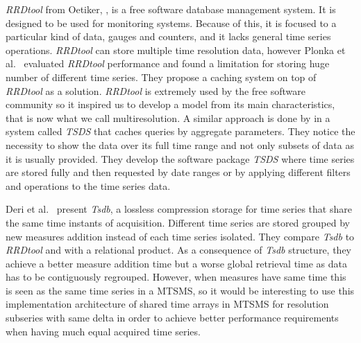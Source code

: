 \emph{RRDtool} from Oetiker, \cite{rrdtool,lisa98:oetiker}, is a free
software database management system. It is designed to be used for
monitoring systems. Because of this, it is focused to a particular
kind of data, gauges and counters, and it lacks general time series
operations. \emph{RRDtool} can store multiple time resolution data,
however Plonka et al.\ \cite{lisa07:plonka} evaluated \emph{RRDtool}
performance and found a limitation for storing huge number of
different time series. They propose a caching system on top of
\emph{RRDtool} as a solution.  \emph{RRDtool} is extremely used by the
free software community so it inspired us to develop a model from its
main characteristics, that is now what we call multiresolution. A
similar approach is done by \cite{weigel10} in a system called
\emph{TSDS} that caches queries by aggregate parameters. They notice
the necessity to show the data over its full time range and not only
subsets of data as it is usually provided.  They develop the software
package \emph{TSDS} where time series are stored fully and then
requested by date ranges or by applying different filters and
operations to the time series data.


Deri et al.\ \cite{deri12:tsdb_compressed_database} present
\emph{Tsdb}, a lossless compression storage  for time
series that share the same time instants of acquisition. Different
time series are stored grouped by new measures addition instead of
each time series isolated.  They compare \emph{Tsdb} to \emph{RRDtool} and
with a relational product. As a consequence of \emph{Tsdb} structure,
they achieve a better measure addition time but a worse global
retrieval time as data has to be contiguously regrouped. However, when
measures have same time this is seen as the same time series in a
MTSMS, so it would be interesting to use this implementation
architecture of shared time arrays in MTSMS for resolution subseries
with same delta in order to achieve better performance requirements
when having much equal acquired time series.



